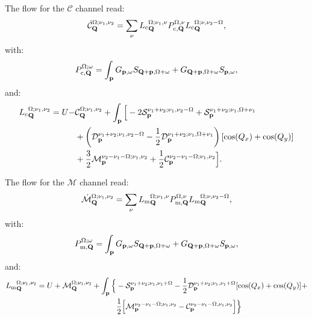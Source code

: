 The flow for the $\mathcal{C}$ channel read:
\begin{equation}
\dot{\mathcal{C}}_{\mathbf{Q}}^{\Omega;\nu_1,\nu_2} = \sum_{\nu}{L_\mathrm{c}}^{\Omega; \nu_1,\nu}_{\mathbf{Q}} P_{\mathrm{c},\mathbf{Q}}^{\Omega,\nu} {L_\mathrm{c}}^{\Omega; \nu,\nu_2-\Omega}_{\mathbf{Q}}, 
\end{equation} 	   
with: 
\begin{equation}
P_{\mathrm{c},\mathbf{Q}}^{\Omega;\omega} = \int_{\mathbf{p}}  G_{\mathbf{p},\omega}S_{\mathbf{Q}+\mathbf{p},\Omega+\omega} +G_{\mathbf{Q}+\mathbf{p},\Omega+\omega}
S_{\mathbf{p},\omega},
\end{equation} 
and: 
\begin{align} 
{L_\mathrm{c}}^{\Omega;\nu_1,\nu_2}_{\mathbf{Q}}=U-&\mathcal{C}_{\mathbf{Q}}^{\Omega;\nu_1,\nu_2} 
+ \int_{\mathbf{p}} \Big [
- 2 \mathcal{S}_{\mathbf{p}}^{\nu_1+\nu_2;\nu_1,\nu_2-\Omega} + \mathcal{S}_{\mathbf{p}}^{\nu_1+\nu_2;\nu_1,\Omega+\nu_1}
\\ &+ \left( \mathcal{D}_{\mathbf{p}}^{\nu_1+\nu_2;\nu_1,\nu_2-\Omega} -\frac{1}{2} \mathcal{D}_{\mathbf{p}}^{\nu_1+\nu_2;\nu_1,\Omega+\nu_1} \right) [\cos(Q_x)+\cos(Q_y)]
\\ &+ \frac{3}{2} \mathcal{M}_{\mathbf{p}}^{\nu_2-\nu_1-\Omega;\nu_1,\nu_2} 
+ \frac{1}{2} \mathcal{C}_{\mathbf{p}}^{\nu_2-\nu_1-\Omega;\nu_1,\nu_2} \Big].
\end{align}	 

The flow for the $\mathcal{M}$ channel read:
\begin{equation}
\dot{\mathcal{M}}_{\mathbf{Q}}^{\Omega;\nu_1,\nu_2} = \sum_{\nu}{L_\mathrm{m}}^{\Omega; \nu_1,\nu}_{\mathbf{Q}} P_{\mathrm{m},\mathbf{Q}}^{\Omega,\nu} {L_\mathrm{m}}^{\Omega; \nu,\nu_2-\Omega}_{\mathbf{Q}}, 
\end{equation} 	   
with: 
\begin{equation}
P_{\mathrm{m},\mathbf{Q}}^{\Omega;\omega} = \int_{\mathbf{p}}  G_{\mathbf{p},\omega}S_{\mathbf{Q}+\mathbf{p},\Omega+\omega} +G_{\mathbf{Q}+\mathbf{p},\Omega+\omega}
S_{\mathbf{p},\omega},
\end{equation} 
and: 
\begin{align} 
{L_\mathrm{m}}^{\Omega;\nu_1,\nu_2}_{\mathbf{Q}}=U+\mathcal{M}_{\mathbf{Q}}^{\Omega;\nu_1,\nu_2} 
+ \int_{\mathbf{p}} \Big \{& - \mathcal{S}_{\mathbf{p}}^{\nu_1+\nu_2;\nu_1,\nu_1+\Omega}  
-\frac{1}{2} \mathcal{D}_{\mathbf{p}}^{\nu_1+\nu_2;\nu_1,\nu_1+\Omega}
[\cos(Q_x)+\cos(Q_y)] + \\
&\frac{1}{2} \Big[  \mathcal{M}_{\mathbf{p}}^{\nu_2-\nu_1-\Omega; \nu_1,\nu_2} 
- \mathcal{C}_{\mathbf{p}}^{\nu_2-\nu_1-\Omega,\nu_1,\nu_2} \Big] 
\Big \} 
\end{align}	 
